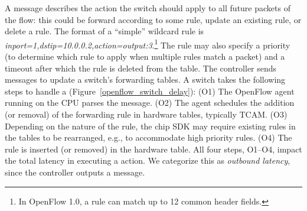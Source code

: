 A \flowmod message describes the action the switch should apply to
all future packets of the flow: this could be forward according to some rule,
update an existing rule, or delete a rule. The format of a ``simple''
wildcard rule is \emph{inport=1,dstip=10.0.0.2,action=output:3}.\footnote{In
OpenFlow 1.0, a rule can match up to 12 common header fields.}
The rule may also specify a priority (to determine which rule to apply when
multiple rules match a packet) and a timeout after which the rule is deleted
from the table. 
\fi
The controller sends \flowmod messages to update a
switch's forwarding tables.
A switch takes the following steps to handle a \flowmod
(Figure~\ref{openflow_switch_delay}): (O1) The
OpenFlow agent running on the CPU parses the message. (O2) The agent
schedules the addition (or removal) of the forwarding rule in hardware tables, typically TCAM.  (O3)
Depending on the nature of the rule, the chip SDK may require existing rules
in the tables to be rearranged, e.g., to accommodate high priority rules.
(O4) The rule is inserted (or removed) in the hardware table.  All four steps, O1--O4,
impact the total latency in executing a \flowmod action. We categorize this
as {\em outbound latency}, since the controller outputs a \flowmod message.

